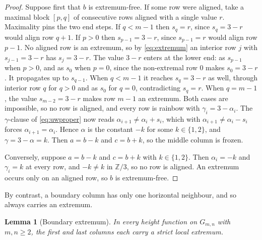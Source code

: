 \documentclass[11pt]{article}
\newtheorem{lemma}[theorem]{Lemma}
\theoremstyle{definition}
\theoremstyle{remark}
\newcommand{\Z}{\mathbb{Z}}
\newcommand{\Gmn}{G_{m,n}}
\begin{document}
\begin{proof}
\medskip\noindent
Suppose first that $b$ is extremum-free. If some row were aligned, take a maximal
block $[p,q]$ of consecutive rows aligned with a single value $r$. Maximality pins
the two end steps. If $q<m-1$ then $s_q=r$, since $s_q=3-r$ would align row $q+1$.
If $p>0$ then $s_{p-1}=3-r$, since $s_{p-1}=r$ would align row $p-1$. No aligned row
is an extremum, so by \eqref{eq:extremum} an interior row $j$ with $s_{j-1}=3-r$ has
$s_j=3-r$. The value $3-r$ enters at the lower end: as $s_{p-1}$ when $p>0$, and as
$s_0$ when $p=0$, since the non-extremal row $0$ makes $s_0=3-r$. It propagates up
to $s_{q-1}$. When $q<m-1$ it reaches $s_q=3-r$ as well, through interior row $q$
for $q>0$ and as $s_0$ for $q=0$, contradicting $s_q=r$. When $q=m-1$, the value
$s_{m-2}=3-r$ makes row $m-1$ an extremum. Both cases are impossible, so no row is
aligned, and every row is rainbow with $\gamma_i=3-\alpha_i$. The $\gamma$-clause of
\eqref{eq:uwproper} now reads $\alpha_{i+1}\ne\alpha_i+s_i$, which with
$\alpha_{i+1}\ne\alpha_i-s_i$ forces $\alpha_{i+1}=\alpha_i$. Hence $\alpha$ is the
constant $-k$ for some $k\in\{1,2\}$, and $\gamma=3-\alpha=k$. Then $a=b-k$ and
$c=b+k$, so the middle column is frozen.

\medskip\noindent
Conversely, suppose $a=b-k$ and $c=b+k$ with $k\in\{1,2\}$. Then $\alpha_i=-k$ and
$\gamma_i=k$ at every row, and $-k\ne k$ in $\Z/3$, so no row is aligned. An
extremum occurs only on an aligned row, so $b$ is extremum-free.
\end{proof}

By contrast, a boundary column has only one horizontal neighbour, and so always
carries an extremum.

\begin{lemma}[Boundary extremum]\label{lem:boundary}
In every height function on $\Gmn$ with $m,n\ge2$, the first and last columns each
carry a strict local extremum.
\end{lemma}
\end{document}

